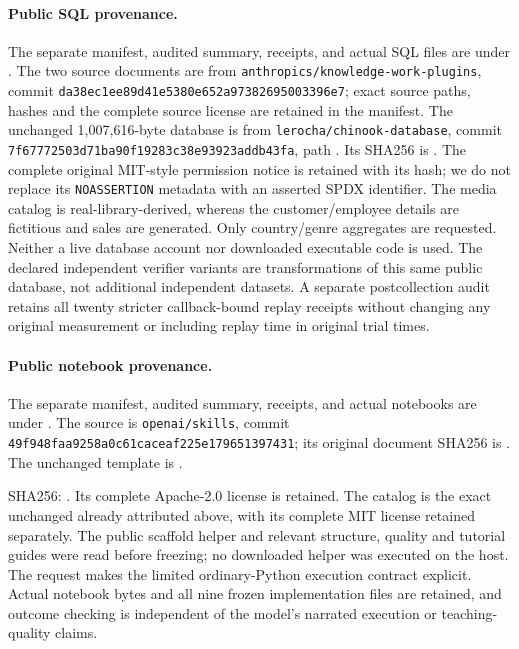 \documentclass{article}
\theoremstyle{plain}
\theoremstyle{definition}
\newcommand{\id}[1]{\texttt{#1}}
\begin{document}
\paragraph{Public SQL provenance.}
The separate manifest, audited summary, receipts, and actual SQL files are
under .
The two source documents are from \id{anthropics/knowledge-work-plugins},
commit \id{da38ec1ee89d41e5380e652a97382695003396e7}; exact source paths,
hashes and the complete source license are retained in the manifest.
The unchanged 1,007,616-byte database is from
\id{lerocha/chinook-database}, commit
\id{7f67772503d71ba90f19283c38e93923addb43fa}, path
.
Its SHA256 is
.
The complete original MIT-style permission notice is retained with its
hash; we do not replace its \id{NOASSERTION} metadata with an asserted
SPDX identifier. The media catalog is real-library-derived, whereas the
customer/employee details are fictitious and sales are generated.
Only country/genre aggregates are requested. Neither a live database
account nor downloaded executable code is used. The declared independent
verifier variants are transformations of this same public database, not
additional independent datasets. A separate postcollection audit retains
all twenty stricter callback-bound replay receipts without changing any
original measurement or including replay time in original trial times.

\paragraph{Public notebook provenance.}
The separate manifest, audited summary, receipts, and actual notebooks are
under .
The source is \id{openai/skills}, commit
\id{49f948faa9258a0c61caceaf225e179651397431}; its original document SHA256 is
.
The unchanged template is
.

SHA256:
.
Its complete Apache-2.0 license is retained. The catalog is the exact
unchanged  already attributed above, with its complete
MIT license retained separately. The public scaffold helper and relevant
structure, quality and tutorial guides were read before freezing; no
downloaded helper was executed on the host. The request makes the limited
ordinary-Python execution contract explicit. Actual notebook bytes and all
nine frozen implementation files are retained, and outcome checking is
independent of the model's narrated execution or teaching-quality claims.
\end{document}
